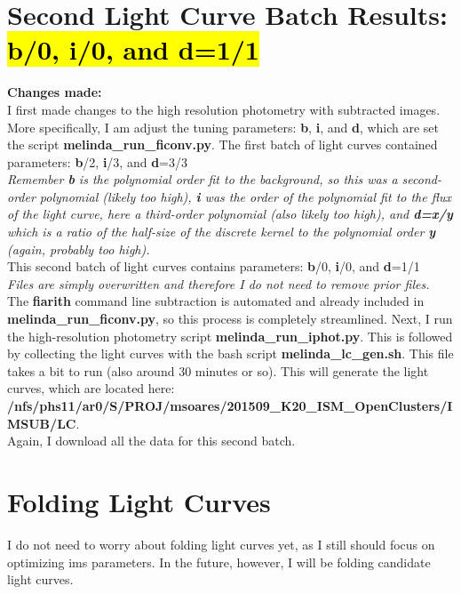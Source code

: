 \documentclass[11pt,letterpaper]{book} %
\begin{document}
\pagebreak

\section*{Second Light Curve Batch Results: \hl{\textbf{b}/0, \textbf{i}/0, and \textbf{d}=1/1}}
\textbf{Changes made:} \\
I first made changes to the high resolution photometry with subtracted images. More specifically, I am adjust the tuning parameters: \textbf{b}, \textbf{i}, and \textbf{d}, which are set the script \textbf{melinda\_run\_ficonv.py}.
The first batch of light curves contained parameters: \textbf{b}/2, \textbf{i}/3, and \textbf{d}=3/3 \\
\textit{Remember \textbf{b} is the polynomial order fit to the background, so this was a second-order polynomial (likely too high), \textbf{i} was the order of the polynomial fit to the flux of the light curve, here a third-order polynomial (also likely too high), and \textbf{d=x/y} which is a ratio of the  half-size of the discrete kernel to the polynomial order \textbf{y} (again, probably too high).}\\
This second batch of light curves contains parameters: \textbf{b}/0, \textbf{i}/0, and \textbf{d}=1/1 \\
\textit{Files are simply overwritten and therefore I do not need to remove prior files.}\\
The \textbf{fiarith} command line subtraction is automated and already included in \textbf{melinda\_run\_ficonv.py}, so this process is completely streamlined. Next, I run the high-resolution photometry script \textbf{melinda\_run\_iphot.py}. This is followed by collecting the light curves with the bash script \textbf{melinda\_lc\_gen.sh}. This file takes a bit to run (also around 30 minutes or so). 
This will generate the light curves, which are located here: \textbf{/nfs/phs11/ar0/S/PROJ/msoares/201509\_K20\_ISM\_OpenClusters/IMSUB/LC}. \\
Again, I download all the data for this second batch.\\

\section*{Folding Light Curves}
I do not need to worry about folding light curves yet, as I still should focus on optimizing ims parameters. In the future, however, I will be folding candidate light curves.
\end{document}
